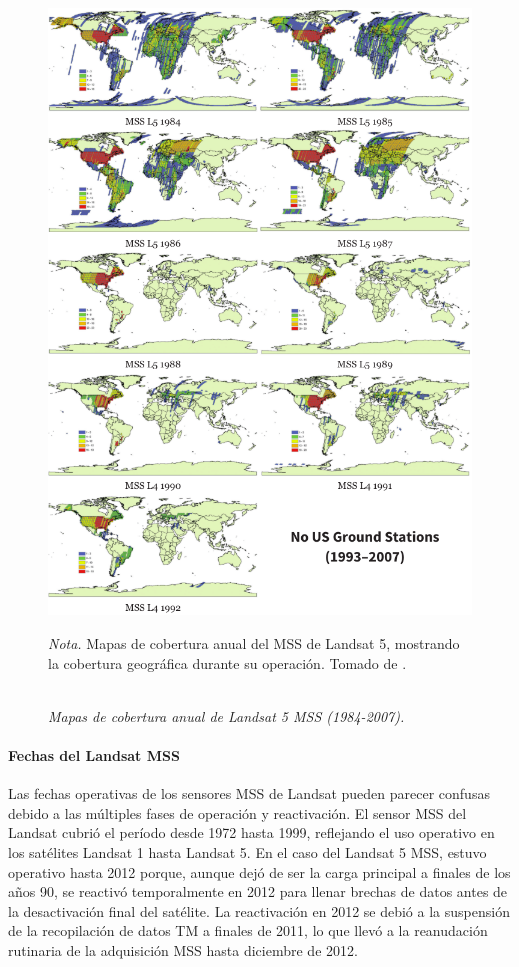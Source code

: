                     \begin{figure}[H] 
                        \caption{\doublespacing \\ \textit{Mapas de cobertura anual de Landsat 5 MSS (1984-2007).}} 
                        \centering
                        \includegraphics[width=0.9\linewidth]{2_CAPITULO2/IMG/landsat5.png}
                        \begin{justify}
                            \textit{Nota.} Mapas de cobertura anual del MSS de Landsat 5, mostrando la cobertura geográfica durante su operación. Tomado de \textcite{landsat_legacy}.
                        \end{justify}                    
                        \label{landsat5}
                    \end{figure}

                \paragraph{Fechas del Landsat MSS}
                    Las fechas operativas de los sensores MSS de Landsat pueden parecer confusas debido a las múltiples fases de operación y reactivación. El sensor MSS del Landsat cubrió el período desde 1972 hasta 1999, reflejando el uso operativo en los satélites Landsat 1 hasta Landsat 5. En el caso del Landsat 5 MSS, estuvo operativo hasta 2012 porque, aunque dejó de ser la carga principal a finales de los años 90, se reactivó temporalmente en 2012 para llenar brechas de datos antes de la desactivación final del satélite. La reactivación en 2012 se debió a la suspensión de la recopilación de datos TM a finales de 2011, lo que llevó a la reanudación rutinaria de la adquisición MSS hasta diciembre de 2012.


